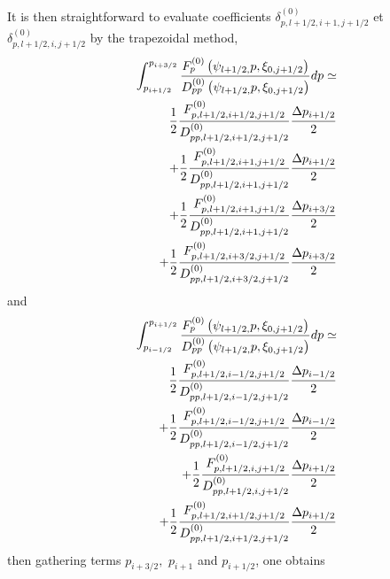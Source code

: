 It is then straightforward to evaluate coefficients $\delta
_{p,l+1/2,i+1,j+1/2}^{\left( 0\right) }$ et $\delta
_{p,l+1/2,i,j+1/2}^{\left( 0\right) }$ by the trapezoidal method,
\begin{eqnarray}
&&\int_{p_{i+1/2}}^{p_{i+3/2}}\frac{F_{p}^{\left( 0\right) }\left( \psi
_{l+1/2,}p,\xi _{0,j+1/2}\right) }{D_{pp}^{\left( 0\right) }\left( \psi
_{l+1/2,}p,\xi _{0,j+1/2}\right) }dp\simeq   \nonumber \\
&&\frac{1}{2}\frac{F_{p,l+1/2,i+1/2,j+1/2}^{\left( 0\right) }}{%
D_{pp,l+1/2,i+1/2,j+1/2}^{\left( 0\right) }}\frac{\Delta p_{i+1/2}}{2}
\nonumber \\
&&+\frac{1}{2}\frac{F_{p,l+1/2,i+1,j+1/2}^{\left( 0\right) }}{%
D_{pp,l+1/2,i+1,j+1/2}^{\left( 0\right) }}\frac{\Delta p_{i+1/2}}{2}
\nonumber \\
&&+\frac{1}{2}\frac{F_{p,l+1/2,i+1,j+1/2}^{\left( 0\right) }}{%
D_{pp,l+1/2,i+1,j+1/2}^{\left( 0\right) }}\frac{\Delta p_{i+3/2}}{2}
\nonumber \\
&&+\frac{1}{2}\frac{F_{p,l+1/2,i+3/2,j+1/2}^{\left( 0\right) }}{%
D_{pp,l+1/2,i+3/2,j+1/2}^{\left( 0\right) }}\frac{\Delta p_{i+3/2}}{2}
\end{eqnarray}
and
\begin{eqnarray}
&&\int_{p_{i-1/2}}^{p_{i+1/2}}\frac{F_{p}^{\left( 0\right) }\left( \psi
_{l+1/2,}p,\xi _{0,j+1/2}\right) }{D_{pp}^{\left( 0\right) }\left( \psi
_{l+1/2,}p,\xi _{0,j+1/2}\right) }dp\simeq   \nonumber \\
&&\frac{1}{2}\frac{F_{p,l+1/2,i-1/2,j+1/2}^{\left( 0\right) }}{%
D_{pp,l+1/2,i-1/2,j+1/2}^{\left( 0\right) }}\frac{\Delta p_{i-1/2}}{2}
\nonumber \\
&&+\frac{1}{2}\frac{F_{p,l+1/2,i-1/2,j+1/2}^{\left( 0\right) }}{%
D_{pp,l+1/2,i-1/2,j+1/2}^{\left( 0\right) }}\frac{\Delta p_{i-1/2}}{2}
\nonumber \\
&&+\frac{1}{2}\frac{F_{p,l+1/2,i,j+1/2}^{\left( 0\right) }}{%
D_{pp,l+1/2,i,j+1/2}^{\left( 0\right) }}\frac{\Delta p_{i+1/2}}{2}  \nonumber
\\
&&+\frac{1}{2}\frac{F_{p,l+1/2,i+1/2,j+1/2}^{\left( 0\right) }}{%
D_{pp,l+1/2,i+1/2,j+1/2}^{\left( 0\right) }}\frac{\Delta p_{i+1/2}}{2}
\end{eqnarray}
then gathering terms $p_{i+3/2},$ $p_{i+1}$ and $p_{i+1/2}$, one obtains
